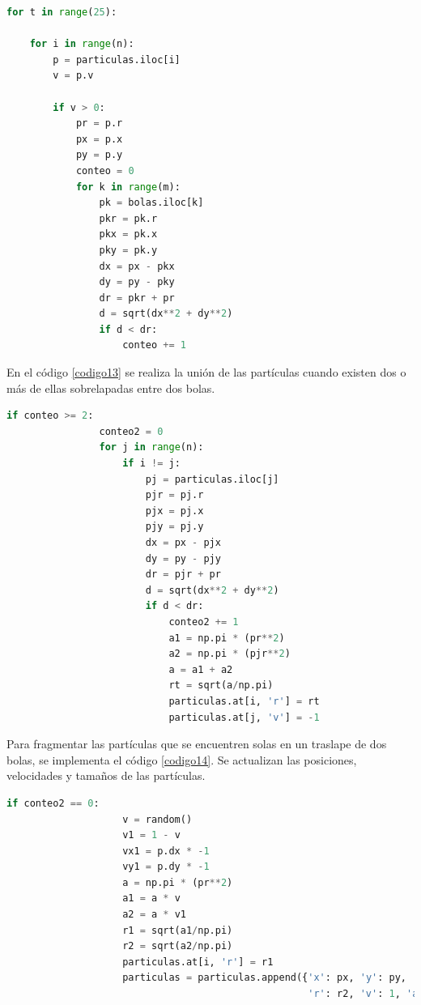 \documentclass{report}
\begin{document}
\begin{lstlisting}[caption=Verificaci\'on de Sobrelapamiento de Part\'iculas y Bolas, label=codigo12, language=Python]
for t in range(25):
    
    for i in range(n):
        p = particulas.iloc[i]
        v = p.v
        
        if v > 0:
            pr = p.r
            px = p.x
            py = p.y
            conteo = 0
            for k in range(m):
                pk = bolas.iloc[k]
                pkr = pk.r
                pkx = pk.x
                pky = pk.y
                dx = px - pkx
                dy = py - pky
                dr = pkr + pr
                d = sqrt(dx**2 + dy**2)
                if d < dr:
                    conteo += 1
\end{lstlisting}

En el c\'odigo \ref{codigo13} se realiza la uni\'on de las part\'iculas cuando existen dos o m\'as de ellas sobrelapadas entre dos bolas.

\begin{lstlisting}[caption=Uni\'on de Part\'iculas Sobrelapadas, label=codigo13, language=Python]
            if conteo >= 2:
                conteo2 = 0
                for j in range(n):
                    if i != j:
                        pj = particulas.iloc[j]
                        pjr = pj.r
                        pjx = pj.x
                        pjy = pj.y
                        dx = px - pjx
                        dy = py - pjy
                        dr = pjr + pr
                        d = sqrt(dx**2 + dy**2)
                        if d < dr:
                            conteo2 += 1
                            a1 = np.pi * (pr**2)
                            a2 = np.pi * (pjr**2)
                            a = a1 + a2
                            rt = sqrt(a/np.pi)
                            particulas.at[i, 'r'] = rt
                            particulas.at[j, 'v'] = -1
\end{lstlisting}

Para fragmentar las part\'iculas  que se encuentren solas en un traslape de dos bolas, se implementa el c\'odigo \ref{codigo14}. Se actualizan las posiciones, velocidades y tama\~nos de las part\'iculas.

\begin{lstlisting}[caption=Fragmentaci\'on de Part\'iculas Sobrelapadas, label=codigo14, language=Python]
                if conteo2 == 0:
                    v = random()
                    v1 = 1 - v
                    vx1 = p.dx * -1
                    vy1 = p.dy * -1
                    a = np.pi * (pr**2)
                    a1 = a * v
                    a2 = a * v1
                    r1 = sqrt(a1/np.pi)
                    r2 = sqrt(a2/np.pi)
                    particulas.at[i, 'r'] = r1
                    particulas = particulas.append({'x': px, 'y': py, 'dx': vx1, 'dy': vy1,\
                                                    'r': r2, 'v': 1, 'a': 1}, ignore_index=True)
\end{lstlisting}
\end{document}
